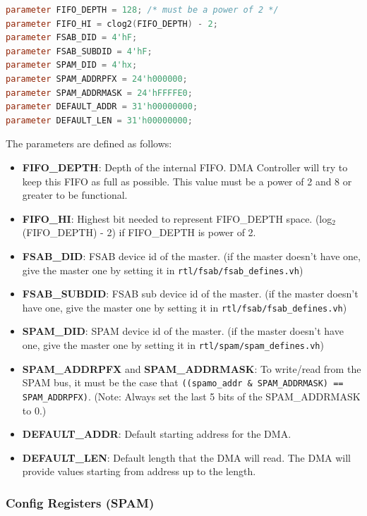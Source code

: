 \documentclass[10pt]{article}
\begin{document}
\begin{lstlisting}[basicstyle=\footnotesize,language=Verilog]
parameter FIFO_DEPTH = 128; /* must be a power of 2 */
parameter FIFO_HI = clog2(FIFO_DEPTH) - 2;
parameter FSAB_DID = 4'hF;
parameter FSAB_SUBDID = 4'hF;
parameter SPAM_DID = 4'hx;
parameter SPAM_ADDRPFX = 24'h000000;
parameter SPAM_ADDRMASK = 24'hFFFFE0;
parameter DEFAULT_ADDR = 31'h00000000;
parameter DEFAULT_LEN = 31'h00000000;
\end{lstlisting}

The parameters are defined as follows:

\begin{itemize}
\item{\textbf{FIFO\_DEPTH}: Depth of the internal FIFO. DMA Controller will
try to keep this FIFO as full as possible. This value must be a power of 2
and 8 or greater to be functional.}
\item{\textbf{FIFO\_HI}: Highest bit needed to represent FIFO\_DEPTH space.
(log${}_2$(FIFO\_DEPTH) - 2) if FIFO\_DEPTH is power of 2.}
\item{\textbf{FSAB\_DID}: FSAB device id of the master. (if the master
doesn't have one, give the master one by setting it in
\texttt{rtl/fsab/fsab\_defines.vh})}
\item{\textbf{FSAB\_SUBDID}: FSAB sub device id of the master. (if the
master doesn't have one, give the master one by setting it in
\texttt{rtl/fsab/fsab\_defines.vh})}
\item{\textbf{SPAM\_DID}: SPAM device id of the master. (if the master
doesn't have one, give the master one by setting it in
\texttt{rtl/spam/spam\_defines.vh})}

\item{\textbf{SPAM\_ADDRPFX} and \textbf{SPAM\_ADDRMASK}: To write/read from
the SPAM bus, it must be the case that \texttt{((spamo\_addr \& SPAM\_ADDRMASK) ==
SPAM\_ADDRPFX)}.  (Note: Always set the last 5 bits of the SPAM\_ADDRMASK to
0.)}

\item{\textbf{DEFAULT\_ADDR}: Default starting address for the DMA.}

\item{\textbf{DEFAULT\_LEN}: Default length that the DMA will read. The DMA will
provide values starting from address up to the length.}

\end{itemize}

\subsubsection{Config Registers (SPAM)}
\end{document}
